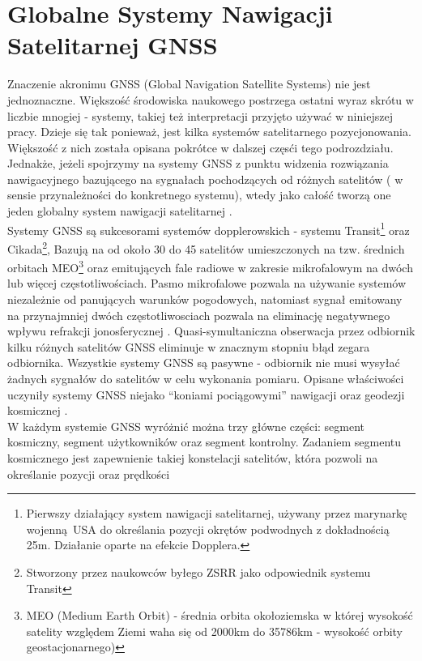 \section{Globalne Systemy Nawigacji Satelitarnej GNSS}
\noindent Znaczenie akronimu GNSS (Global Navigation Satellite Systems) nie jest jednoznaczne. Większość środowiska naukowego 
postrzega ostatni wyraz skrótu w liczbie mnogiej - systemy, takiej też interpretacji przyjęto używać w niniejszej pracy.
Dzieje się tak ponieważ, jest kilka systemów satelitarnego pozycjonowania. Większość z nich 
została opisana pokrótce w dalszej częsći tego podrozdziału. Jednakże, jeżeli spojrzymy na systemy GNSS z punktu widzenia rozwiązania 
nawigacyjnego bazującego na sygnałach pochodzących od różnych satelitów ( w sensie przynależności do konkretnego systemu), wtedy jako całość 
tworzą one jeden globalny system nawigacji satelitarnej \cite[][strona vii]{hofmann_gnss}.\\
\indent Systemy GNSS są sukcesorami systemów dopplerowskich - systemu Transit\footnote{Pierwszy
działający system nawigacji satelitarnej, używany przez marynarkę wojenną USA 
do określania pozycji okrętów podwodnych z dokładnością 25m. Działanie oparte na efekcie Dopplera.} oraz Cikada\footnote{Stworzony przez naukowców byłego ZSRR 
jako odpowiednik systemu Transit}, Bazują na od około 30 do 45 satelitów umieszczonych na tzw. średnich orbitach MEO\footnote{MEO 
(Medium Earth Orbit) - średnia orbita okołoziemska w której wysokość satelity względem Ziemi waha się od 2000km do 35786km - wysokość orbity geostacjonarnego)}
oraz emitujących fale radiowe w zakresie mikrofalowym na dwóch lub więcej częstotliwościach.
Pasmo mikrofalowe pozwala na używanie systemów niezależnie od panujących warunków pogodowych, natomiast sygnał emitowany na przynajmniej dwóch częstotliwosciach 
pozwala na eliminację negatywnego wpływu refrakcji jonosferycznej \cite[][strona 33]{ggos}. Quasi-symultaniczna obserwacja przez odbiornik kilku różnych 
satelitów GNSS eliminuje w znacznym stopniu błąd zegara odbiornika. Wszystkie systemy GNSS są pasywne - odbiornik nie musi wysyłać żadnych sygnałów do satelitów w 
celu wykonania pomiaru. Opisane właściwości uczyniły systemy GNSS niejako \enquote{koniami pociągowymi} nawigacji oraz geodezji kosmicznej \cite[][strona 36]{ggos}.\\
\indent W każdym systemie GNSS wyróżnić można trzy główne części: segment kosmiczny, segment użytkowników oraz segment kontrolny.
Zadaniem segmentu kosmicznego jest zapewnienie takiej konstelacji satelitów, która pozwoli na określanie pozycji oraz prędkości
